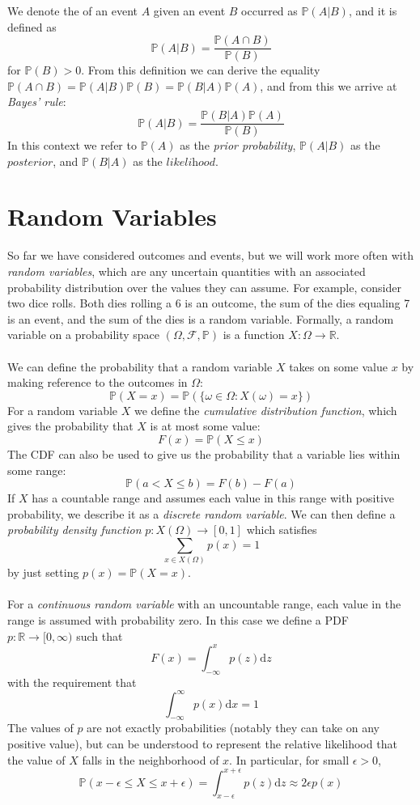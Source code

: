 \documentclass{article}
\newcommand{\PrMe}{\mathbb{P}}
\begin{document}
We denote the  of an event $A$ given an event $B$ occurred as $\PrMe(A | B)$, and it is defined as $$\PrMe(A | B) = \frac{\PrMe(A\cap B)}{\PrMe(B)}$$ for $\PrMe(B) > 0$. From this definition we can derive the equality $\PrMe(A\cap B) = \PrMe(A|B)\PrMe(B) = \PrMe(B|A)\PrMe(A)$, and from this we arrive at \textit{Bayes' rule}: $$\PrMe(A|B) = \frac{\PrMe(B|A)\PrMe(A)}{\PrMe(B)}$$ In this context we refer to $\PrMe(A)$ as the \textit{prior probability}, $\PrMe(A|B)$ as the $\textit{posterior}$, and $\PrMe(B|A)$ as the $\textit{likelihood}$.

\section{Random Variables}
So far we have considered outcomes and events, but we will work more often with \textit{random variables}, which are any uncertain quantities with an associated probability distribution over the values they can assume. For example, consider two dice rolls. Both dies rolling a 6 is an outcome, the sum of the dies equaling 7 is an event, and the sum of the dies is a random variable. Formally, a random variable on a probability space $(\Omega, \mathcal{F}, \PrMe)$ is a function $X: \Omega \rightarrow \mathbb{R}$. \\\\
We can define the probability that a random variable $X$ takes on some value $x$ by making reference to the outcomes in $\Omega$: $$\PrMe(X = x) = \PrMe(\{\omega \in \Omega : X(\omega) = x\})$$
For a random variable $X$ we define the \textit{cumulative distribution function}, which gives the probability that $X$  is at most some value: $$F(x) = \PrMe(X \leq x)$$
The CDF can also be used to give us the probability that a variable lies within some range: $$\PrMe(a < X \leq b) = F(b) - F(a)$$
If $X$ has a countable range and assumes each value in this range with positive probability, we describe it as a \textit{discrete random variable}. We can then define a \textit{probability density function} $p: X(\Omega) \rightarrow [0, 1]$ which satisfies $$\sum_{x \in X(\Omega)} p(x) = 1$$ by just setting $p(x) = \PrMe(X = x)$. \\\\
For a \textit{continuous random variable} with an uncountable range, each value in the range is assumed with probability zero. In this case we define a PDF $p: \mathbb{R} \rightarrow [0, \infty)$ such that $$F(x) = \int_{-\infty}^x p(z) \text{d}z$$ with the requirement that $$\int_{-\infty}^\infty p(x)\text{d}x = 1$$ The values of $p$ are not exactly probabilities (notably they can take on any positive value), but can be understood to represent the relative likelihood that the value of $X$ falls in the neighborhood of $x$. In particular, for small $\epsilon > 0$, $$\PrMe(x - \epsilon \leq X \leq x + \epsilon) = \int_{x - \epsilon}^{x + \epsilon} p(z)\text{d}z \approx 2\epsilon p(x)$$
\end{document}
